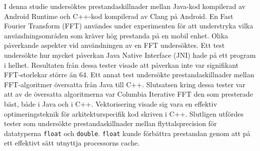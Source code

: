 I denna studie undersöktes prestandaskillnader mellan Java-kod kompilerad av Android Runtime och C++-kod kompilerad av Clang på Android. En Fast Fourier Transform (FFT) användes under experimenten för att understryka vilka användningsområden som kräver hög prestanda på en mobil enhet. Olika påverkande aspekter vid användningen av en FFT undersöktes. Ett test undersökte hur mycket påverkan Java Native Interface (JNI) hade på ett program i helhet. Resultaten från dessa tester visade att påverkan inte var signifikant FFT-storlekar större än 64. Ett annat test undersökte prestandaskillnader mellan FFT-algoritmer översatta från Java till C++. Slutsatsen kring dessa tester var att av de översatta algoritmerna var Columbia Iterative FFT den som presterade bäst, både i Java och i C++. Vektorisering visade sig vara en effektiv optimeringsteknik för arkitekturspecifik kod skriven i C++. Slutligen utfördes tester som undersökte prestandaskillnader mellan flyttalsprecision för datatyperna \texttt{float} och \texttt{double}. \texttt{float} kunde förbättra prestandan genom att på ett effektivt sätt utnyttja processorns cache.
